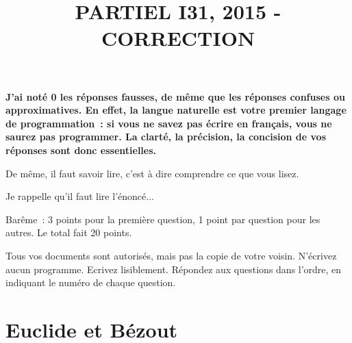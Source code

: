 \documentclass[11pt]{article}
\begin{document}
\title{PARTIEL I31, 2015 - CORRECTION}
\date{}\maketitle


{\bf 
J'ai noté 0 les réponses fausses, de même que les réponses 
confuses ou approximatives.
En effet, la langue naturelle est votre premier langage de programmation~: 
si vous ne savez pas écrire en français, vous ne saurez pas programmer.
La clarté, la précision, la concision de vos réponses sont donc essentielles.

De même, il faut savoir lire, c'est à dire comprendre ce que vous lisez.

Je rappelle qu'il faut lire l'énoncé...

Barême~: 3 points pour la première question, 1 point par question pour les autres. Le total fait 20 points.
}

\medskip
Tous vos documents sont autorisés, mais pas la copie de votre voisin.
N’écrivez aucun programme. Ecrivez lisiblement. Répondez aux questions
dans l’ordre, en indiquant le numéro de chaque question.

\section{Euclide et Bézout}

\smallskip
\end{document}
